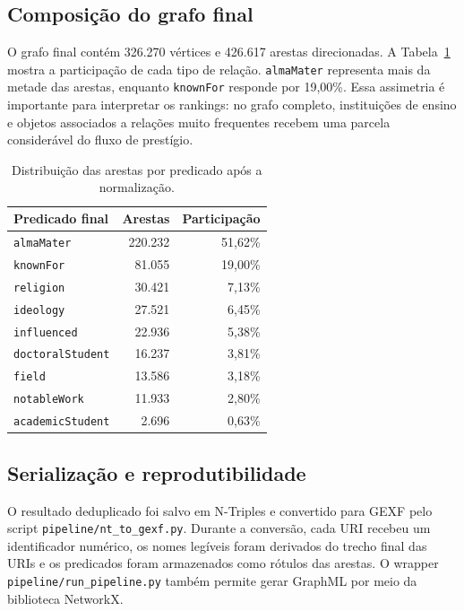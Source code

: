 \documentclass[10pt,a4paper]{article}
\begin{document}
\subsection{Composição do grafo final}

O grafo final contém 326.270 vértices e 426.617 arestas direcionadas. A Tabela~\ref{tab:predicados} mostra a participação de cada tipo de relação. \texttt{almaMater} representa mais da metade das arestas, enquanto \texttt{knownFor} responde por 19,00\%. Essa assimetria é importante para interpretar os rankings: no grafo completo, instituições de ensino e objetos associados a relações muito frequentes recebem uma parcela considerável do fluxo de prestígio.

\begin{table}[htbp]
  \centering
  \caption{Distribuição das arestas por predicado após a normalização.}
  \label{tab:predicados}
  \begin{tabular}{lrr}
    \toprule
    Predicado final & Arestas & Participação \\
    \midrule
    \texttt{almaMater} & 220.232 & 51,62\% \\
    \texttt{knownFor} & 81.055 & 19,00\% \\
    \texttt{religion} & 30.421 & 7,13\% \\
    \texttt{ideology} & 27.521 & 6,45\% \\
    \texttt{influenced} & 22.936 & 5,38\% \\
    \texttt{doctoralStudent} & 16.237 & 3,81\% \\
    \texttt{field} & 13.586 & 3,18\% \\
    \texttt{notableWork} & 11.933 & 2,80\% \\
    \texttt{academicStudent} & 2.696 & 0,63\% \\
    \bottomrule
  \end{tabular}
\end{table}

\subsection{Serialização e reprodutibilidade}

O resultado deduplicado foi salvo em N-Triples e convertido para GEXF pelo script \texttt{pipeline/nt\_to\_gexf.py}. Durante a conversão, cada URI recebeu um identificador numérico, os nomes legíveis foram derivados do trecho final das URIs e os predicados foram armazenados como rótulos das arestas. O wrapper \texttt{pipeline/run\_pipeline.py} também permite gerar GraphML por meio da biblioteca NetworkX.
\end{document}
